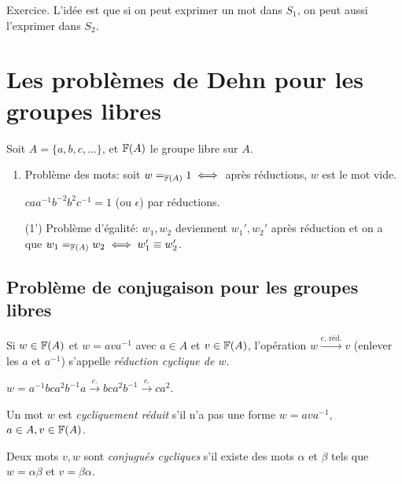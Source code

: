   \begin{preuve}
    Exercice. L'idée est que si on peut exprimer un mot dans $S_1$, on peut aussi l'exprimer dans $S_2$.
  \end{preuve}

  \section{Les problèmes de Dehn pour les groupes libres}
  \label{sec:pb-dehn-grps-libres}

    Soit $A = \{a, b, c, \ldots \}$, et $\mathbb{F}(A)$ le groupe libre sur $A$. 
    \begin{enumerate}
    \item Problème des mots: soit $w =_{\mathbb{F}(A)} 1 \iff $ après réductions, $w$ est le mot vide.

          $caa^{-1}b^{-2}b^2c^{-1} = 1$ (ou $\epsilon$) par réductions.

    \item[(1')] Problème d'égalité: $w_1, w_2$ deviennent $w_1', w_2'$ après réduction et on a que $w_1 =_{\mathbb{F}(A)} w_2
      \iff w_1' \equiv w_2'$.
    \end{enumerate}

    \subsection{Problème de conjugaison pour les groupes libres}
    \label{sec:pb-conjugaison-grp-libre}

    \begin{defi}
      Si $w \in \mathbb{F}(A)$ et $w = ava^{-1}$ avec $a \in A$ et $v \in \mathbb{F}(A)$, l'opération $w
      \xrightarrow{\text{c. réd.}} v$ (enlever les $a$ et $a^{-1}$) s'appelle \emph{réduction cyclique de $w$}.
    \end{defi}

    \begin{ex}
      $w = a^{-1}bca^2b^{-1}a \xrightarrow{c.} bca^2b^{-1} \xrightarrow{c.} ca^2$.
    \end{ex}

    \begin{defi}
      Un mot $w$ est \emph{cycliquement réduit} s'il n'a pas une forme $w = ava^{-1}$, $a \in A, v \in \mathbb{F}(A)$.
    \end{defi}

    \begin{defi}
      Deux mots $v, w$ sont \emph{conjugués cycliques} s'il existe des mots $\alpha$ et $\beta$ tels que $w =
      \alpha \beta$ et $v = \beta \alpha$.
    \end{defi}

